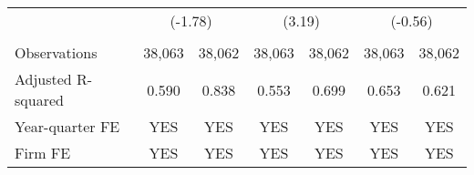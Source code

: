 \begin{table}[htbp]
\begin{tabular}{lcccccc}
    \rowcolor[rgb]{ .933,  .925,  .882}  & \multicolumn{2}{c}{(-1.78)} & \multicolumn{2}{c}{ (3.19)} & \multicolumn{2}{c}{(-0.56)} \\
    &   &   &   &   &   &  \\
    Observations & 38,063 & 38,062 & 38,063 & 38,062 & 38,063 & 38,062 \\
    Adjusted R-squared & 0.590 & 0.838 & 0.553 & 0.699 & 0.653 & 0.621 \\
    Year-quarter FE & YES & YES & YES & YES & YES & YES \\
    Firm FE & YES & YES & YES & YES & YES & YES \\
    \bottomrule
    \bottomrule
    \end{tabular}%
\end{table}%